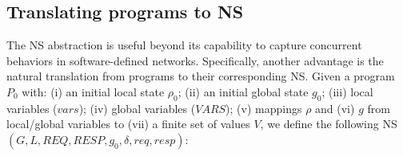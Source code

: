 %
%
%
%
%
%

\subsection{Translating \toolname{} programs to NS}
%
The NS abstraction is useful beyond its capability to capture concurrent behaviors in software-defined networks.
%
Specifically, another advantage is the natural translation from  \toolname{} programs to their corresponding NS.
%
%
Given a \toolname{} program \(P_0\) with: (i) an initial local state \(\rho_0\); (ii) an initial global state \(g_0\); (iii) local variables (\(vars\)); (iv) global variables (\(VARS\)); (v) mappings \(\rho\) and (vi) \(g\) from local/global variables to (vii) a finite set of values \(V\), we define the following NS $(G, L, \mathit{REQ},  \mathit{RESP}, g_0, \delta, \mathit{req}, \mathit{resp})$:

